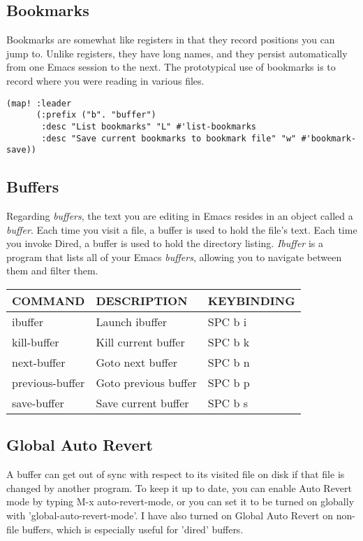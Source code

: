 \documentclass[11pt]{article}
\begin{document}
\subsection{Bookmarks}
\label{sec:org5f2bd3a}
Bookmarks are somewhat like registers in that they record positions you can jump to.  Unlike registers, they have long names, and they persist automatically from one Emacs session to the next. The prototypical use of bookmarks is to record where you were reading in various files.

\begin{verbatim}
(map! :leader
      (:prefix ("b". "buffer")
       :desc "List bookmarks" "L" #'list-bookmarks
       :desc "Save current bookmarks to bookmark file" "w" #'bookmark-save))
\end{verbatim}

\subsection{Buffers}
\label{sec:orgf5c2da5}
Regarding \emph{buffers}, the text you are editing in Emacs resides in an object called a \emph{buffer}. Each time you visit a file, a buffer is used to hold the file’s text. Each time you invoke Dired, a buffer is used to hold the directory listing.  \emph{Ibuffer} is a program that lists all of your Emacs \emph{buffers}, allowing you to navigate between them and filter them.

\begin{center}
\begin{tabular}{lll}
COMMAND & DESCRIPTION & KEYBINDING\\[0pt]
\hline
ibuffer & Launch ibuffer & SPC b i\\[0pt]
kill-buffer & Kill current buffer & SPC b k\\[0pt]
next-buffer & Goto next buffer & SPC b n\\[0pt]
previous-buffer & Goto previous buffer & SPC b p\\[0pt]
save-buffer & Save current buffer & SPC b s\\[0pt]
\end{tabular}
\end{center}

\subsection{Global Auto Revert}
\label{sec:orgd73b193}
A buffer can get out of sync with respect to its visited file on disk if that file is changed by another program. To keep it up to date, you can enable Auto Revert mode by typing M-x auto-revert-mode, or you can set it to be turned on globally with 'global-auto-revert-mode'.  I have also turned on Global Auto Revert on non-file buffers, which is especially useful for 'dired' buffers.
\end{document}
